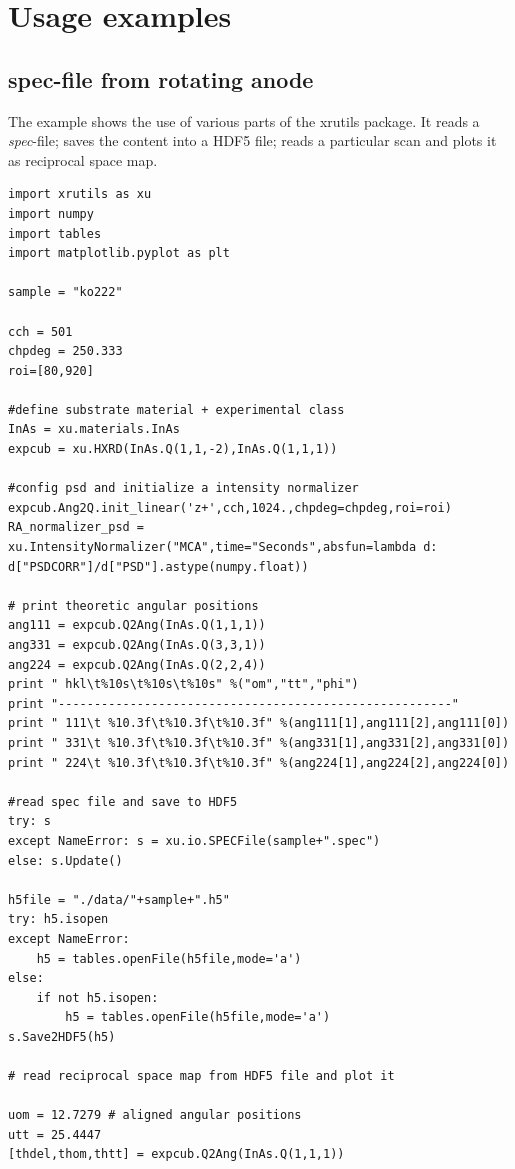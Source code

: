 \section{Usage examples}

\subsection{spec-file from rotating anode}

The example shows the use of various parts of the xrutils package. It reads a \emph{spec}-file; saves the content into a HDF5 file; reads a particular scan and plots it as reciprocal space map.

\begin{lstlisting}[caption={reading a spec-file, saving it to HDF5, reading a particular scan, convert it to reciprocal space, plot it using matplotlib}]
import xrutils as xu
import numpy
import tables
import matplotlib.pyplot as plt

sample = "ko222"

cch = 501
chpdeg = 250.333
roi=[80,920]

#define substrate material + experimental class
InAs = xu.materials.InAs
expcub = xu.HXRD(InAs.Q(1,1,-2),InAs.Q(1,1,1))

#config psd and initialize a intensity normalizer
expcub.Ang2Q.init_linear('z+',cch,1024.,chpdeg=chpdeg,roi=roi)
RA_normalizer_psd = xu.IntensityNormalizer("MCA",time="Seconds",absfun=lambda d: d["PSDCORR"]/d["PSD"].astype(numpy.float))

# print theoretic angular positions
ang111 = expcub.Q2Ang(InAs.Q(1,1,1))
ang331 = expcub.Q2Ang(InAs.Q(3,3,1))
ang224 = expcub.Q2Ang(InAs.Q(2,2,4))
print " hkl\t%10s\t%10s\t%10s" %("om","tt","phi")
print "-------------------------------------------------------"
print " 111\t %10.3f\t%10.3f\t%10.3f" %(ang111[1],ang111[2],ang111[0])
print " 331\t %10.3f\t%10.3f\t%10.3f" %(ang331[1],ang331[2],ang331[0])
print " 224\t %10.3f\t%10.3f\t%10.3f" %(ang224[1],ang224[2],ang224[0])

#read spec file and save to HDF5
try: s
except NameError: s = xu.io.SPECFile(sample+".spec")
else: s.Update()

h5file = "./data/"+sample+".h5"
try: h5.isopen
except NameError:
    h5 = tables.openFile(h5file,mode='a')
else: 
    if not h5.isopen:
        h5 = tables.openFile(h5file,mode='a')
s.Save2HDF5(h5)

# read reciprocal space map from HDF5 file and plot it

uom = 12.7279 # aligned angular positions
utt = 25.4447
[thdel,thom,thtt] = expcub.Q2Ang(InAs.Q(1,1,1))


\end{lstlisting}
